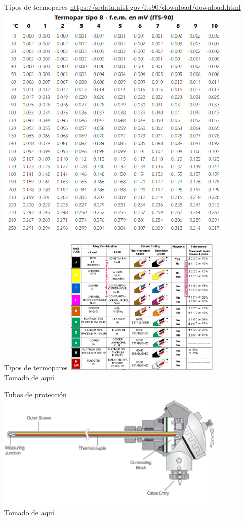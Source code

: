 \documentclass[aspectratio=169]{beamer}
\begin{document}
\begin{frame}{Tipos de termopares \tiny{\href{https://srdata.nist.gov/its90/download/download.html}{https://srdata.nist.gov/its90/download/download.html}}}
\centering
    \includegraphics[width=11.5cm]{fig/ITS-90.PNG}
\end{frame}

\begin{frame}{Tipos de termopares}
\centering
    \includegraphics[width=7.5cm]{fig/thermometricscorp.png}
    \\ \tiny{Tomado de \href{https://www.thermometricscorp.com/thermocouple-color-code.html}{aquí}}
\end{frame}

\begin{frame}{Tubos de protección}
\centering
    \includegraphics[width=11cm]{fig/thermocouple-probe-head.png}
    \\ \tiny{Tomado de \href{https://www.tcaus.com.au/thermocouple/index.html}{aquí}}
\end{frame}
\end{document}
